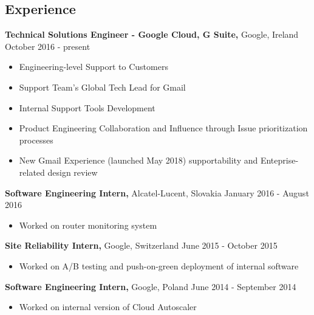 \documentclass[margin]{res}
\begin{document}
\begin{resume}


\section{Experience}

{\bf Technical Solutions Engineer - Google Cloud, G Suite,} Google, Ireland \hfill October 2016 - present
\begin{itemize} \itemsep -2pt %
\item Engineering-level Support to Customers
\item Support Team's Global Tech Lead for Gmail
\item Internal Support Tools Development
\item Product Engineering Collaboration and Influence through Issue prioritization processes
\item New Gmail Experience (launched May 2018) supportability and Enteprise-related design review
\end{itemize}

{\bf Software Engineering Intern,} Alcatel-Lucent, Slovakia \hfill January 2016 - August 2016
\begin{itemize} \itemsep -2pt %
\item Worked on router monitoring system
\end{itemize}

{\bf Site Reliability Intern,} Google, Switzerland \hfill June 2015 - October 2015
\begin{itemize} \itemsep -2pt %
\item Worked on A/B testing and push-on-green deployment of internal software
\end{itemize}

{\bf Software Engineering Intern,} Google, Poland \hfill June 2014 - September 2014
\begin{itemize} \itemsep -2pt %
\item Worked on internal version of Cloud Autoscaler
\end{itemize}


\end{resume}
\end{document}
